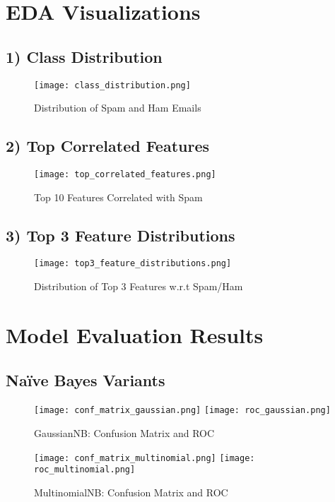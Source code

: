 \documentclass[12pt]{article}
\begin{document}
\section*{EDA Visualizations}

\subsection*{1) Class Distribution}
\begin{figure}[H]
\centering
\texttt{[image: class\_distribution.png]}
\caption{Distribution of Spam and Ham Emails}
\end{figure}

\subsection*{2) Top Correlated Features}
\begin{figure}[H]
\centering
\texttt{[image: top\_correlated\_features.png]}
\caption{Top 10 Features Correlated with Spam}
\end{figure}

\subsection*{3) Top 3 Feature Distributions}
\begin{figure}[H]
\centering
\texttt{[image: top3\_feature\_distributions.png]}
\caption{Distribution of Top 3 Features w.r.t Spam/Ham}
\end{figure}

\section*{Model Evaluation Results}

\subsection*{Naïve Bayes Variants}

\begin{figure}[H]
\centering
\texttt{[image: conf\_matrix\_gaussian.png]}
\texttt{[image: roc\_gaussian.png]}
\caption{GaussianNB: Confusion Matrix and ROC}
\end{figure}

\begin{figure}[H]
\centering
\texttt{[image: conf\_matrix\_multinomial.png]}
\texttt{[image: roc\_multinomial.png]}
\caption{MultinomialNB: Confusion Matrix and ROC}
\end{figure}
\end{document}

